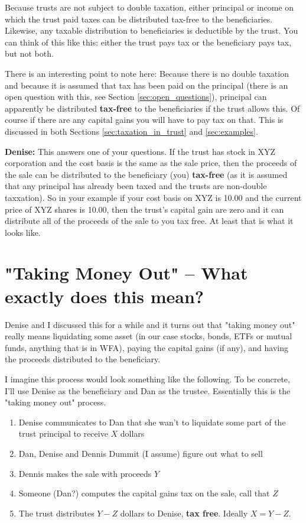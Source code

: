 \documentclass[11pt, oneside]{article}   	%
\theoremstyle{definition}
\begin{document}
\bigskip
\noindent
Because trusts are not subject to double taxation, either principal or income on which the trust paid taxes can be distributed
tax-free to the beneficiaries. Likewise, any taxable distribution to beneficiaries is deductible by the trust. You can think of this
like this: either the trust pays tax or the beneficiary pays tax, but not both. 

\bigskip
\noindent
There is an interesting point to note here: Because there is no double taxation and because it is assumed that tax has been paid
on the principal (there is an open question with this,  see Section \ref{sec:open_questions}), principal can apparently be distributed \textbf{tax-free} to 
the beneficiaries if the trust allows this. Of course if there are any capital gains you will have to pay tax on that. This is discussed 
in both Sections \ref{sec:taxation_in_trust} and \ref{sec:examples}.

\bigskip
\noindent
\textbf{Denise:} This answers one of your questions. If the trust has stock in XYZ corporation and the cost basis is the same
as the sale price, then the  proceeds of the sale can be distributed to the beneficiary (you) \textbf{tax-free} (as it is 
assumed that any principal has already been taxed and the trusts are non-double taxxation). So in your example if your cost 
basis on XYZ is 10.00 and the current price of XYZ shares is 10.00, then the trust's capital gain are zero and it can distribute 
all of the proceeds of the sale to you  tax free. At least that is what it looks like.




\section{"Taking Money Out" -- What exactly does this mean?}
\label{sec:tmo}
Denise and I discussed this for a while and it turns out that "taking money out" really means liquidating some asset (in our case 
stocks, bonds, ETFs or mutual funds, anything that is in WFA), paying the capital gains (if any), and having the proceeds distributed 
to the beneficiary. 

\bigskip
\noindent
I imagine this process would look something like the following. To be concrete, I'll use Denise as the beneficiary and Dan as the trustee.
Essentially this is the "taking money out" process.

\begin{enumerate}
\item Denise communicates to Dan that she wan't to liquidate some part of the trust principal to receive $X$ dollars
\item Dan, Denise and Dennis Dummit (I assume) figure out what to sell
\item Dennis makes the sale with proceeds $Y$
\item Someone (Dan?) computes the capital gains tax on the sale, call that $Z$
\item The trust distributes $Y - Z$ dollars to Denise, \textbf{tax free}. Ideally $X = Y - Z$.
\end{enumerate}
\end{document}
